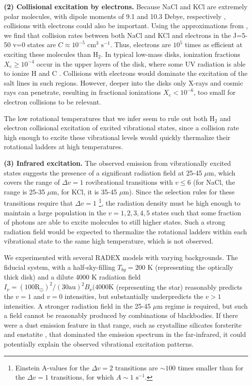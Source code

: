 \documentclass[12pt]{article}
\newcommand{\hh}{\ensuremath{\textrm{H}_{2}}\xspace}			%
\newcommand{\pers}{\ensuremath{\mathrm{s}^{-1}}\xspace}
\newcommand{\um}{\ensuremath{\mu \textrm{m}}\xspace}    %
\begin{document}
\par{\textbf{(2) Collisional excitation by electrons.}} 
Because NaCl and KCl are extremely polar molecules, with dipole moments of 9.1
and 10.3 Debye, respectively \cite{Barton2014a}, collisions with electrons
could also be important.  Using the approximations from \cite{Dickinson1975a},
we find that collision rates between both NaCl and KCl and electrons in the
J=5-50 v=0 states are $C\approx10^{-5}$ cm$^{3}$ \pers.  Thus, electrons are
$10^5$ times as efficient at exciting these molecules than \hh. In typical
low-mass disks, ionization fractions $X_e \geq 10^{-4}$ occur in the upper
layers of the disk, where some UV radiation is able to ionize H and C
\cite{Bergin2007a}.  Collisions with electrons would dominate the excitation
of the salt lines in such regions.  However, deeper into the disks only X-rays
and cosmic rays can penetrate, resulting in fractional ionizations $X_e <
10^{-6}$, too small for electron collisions to be relevant. 

The low rotational temperatures that we infer seem to rule out both \hh and
electron collisional excitation of excited vibrational states, since a
collision rate high enough to excite these vibrational levels would quickly
thermalize their rotational ladders at high temperatures.


\par{\textbf{(3) Infrared excitation.}} 
The observed emission from vibrationally excited states suggests the
presence of a significant radiation field at 25-45 \um, which covers the range
of $\Delta v=1$ rovibrational transitions with $v\leq6$ (for NaCl, the range is
25-35 \um, for KCl, it is 35-45 \um).  Since the selection rules for these
transitions require that $\Delta v=1$ \footnote{Einstein A-values for the 
$\Delta v=2$ transitions are $\sim100$ times smaller than for the $\Delta v=1$
transitions, for which $A\sim1$ \pers.}, the radiation density must be high
enough to maintain a large population in the $v=1,
2, 3, 4, 5$ states such that some fraction of photons are able to excite
molecules to still higher states.  Such a strong radiation field would
be expected to thermalize the rotational ladders within each vibrational
state to the same high temperature, which is not observed.

We experimented with several RADEX models with varying backgrounds.  The
fiducial system, with a half-sky-filling $T_{bg}=200$ K (representing the
optically thick disk) and a dilute 4000 K radiation field $I_{\nu} = (100
\mathrm{R_\odot})^2 / (30 \mathrm{au})^2 B_\nu(4000 \mathrm{K}$ (representing
the star) reasonably predicts the $v=1$ and $v=0$ intensities, but
substantially underpredicts the $v>1$ intensities.  A stronger radiation
field in the 25-45 \um regime is required, but such a field cannot be
reasonably produced by combinations of blackbodies.  If there were a dust
emission feature in that range, such as crystalline silicates forsterite
and enstatite \cite{Molster2005a}, that dominated the emission spectrum
in the far-infrared, it could potentially explain the observed vibrational
excitation patterns.
\end{document}
